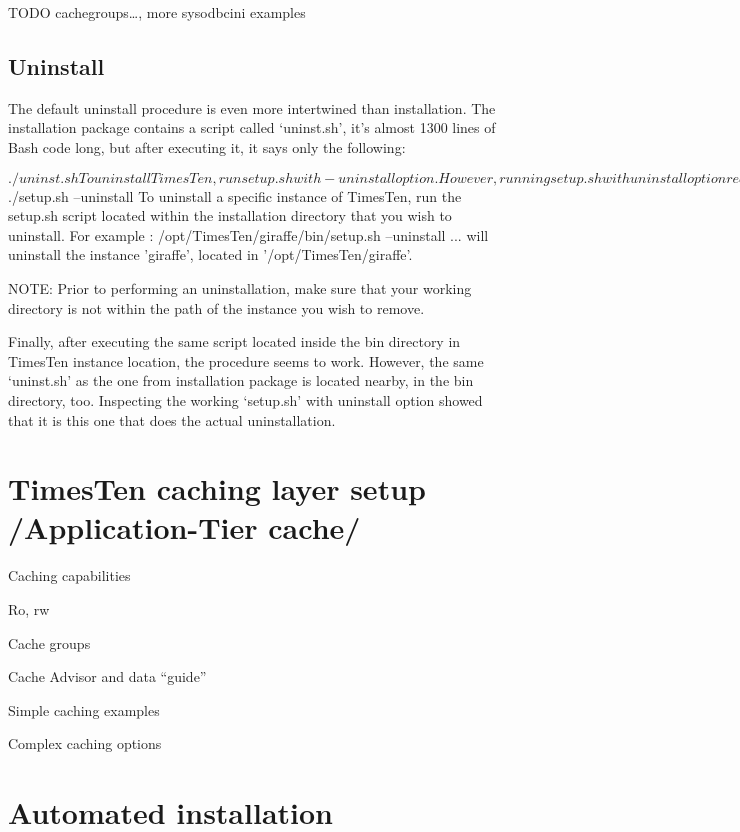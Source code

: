 \documentclass[11pt, letterpaper]{article}            %
\begin{document}
TODO cachegroups…, more sysodbcini examples

\subsection{Uninstall}

The default uninstall procedure is even more intertwined than installation. The installation package contains a script called ‘uninst.sh’, it’s almost 1300 lines of Bash code long, but after executing it, it says only the following:

$ ./uninst.sh
To uninstall TimesTen, run setup.sh with -uninstall option.

However, running setup.sh with uninstall option requests running it from the location where all the binaries for installed instance are located.

$ ./setup.sh –uninstall
To uninstall a specific instance of TimesTen, run the setup.sh script located
within the installation directory that you wish to uninstall.
For example :
/opt/TimesTen/giraffe/bin/setup.sh –uninstall
... will uninstall the instance 'giraffe', located in '/opt/TimesTen/giraffe'.

NOTE: Prior to performing an uninstallation, make sure that your working
             directory is not within the path of the instance you wish to remove.

 

Finally, after executing the same script located inside the bin directory in TimesTen instance location, the procedure seems to work. However, the same ‘uninst.sh’ as the one from installation package is located nearby, in the bin directory, too. Inspecting the working ‘setup.sh’ with uninstall option showed that it is this one that does the actual uninstallation.

\section{TimesTen caching layer setup /Application-Tier cache/}

Caching capabilities

                Ro, rw

Cache groups

Cache Advisor and data “guide”

Simple caching examples

Complex caching options

\section{Automated installation}
\end{document}
